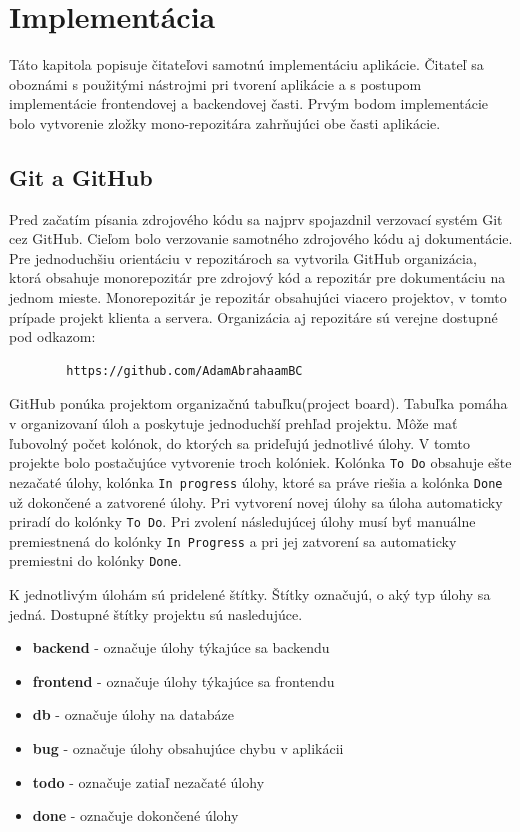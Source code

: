 \chapter{Implementácia}
\label{kapitola5}
Táto kapitola popisuje čitateľovi samotnú implementáciu aplikácie. Čitateľ sa oboznámi s použitými nástrojmi pri tvorení aplikácie a s postupom implementácie frontendovej a backendovej časti. Prvým bodom implementácie bolo vytvorenie zložky mono-repozitára zahrňujúci obe časti aplikácie.

\section{Git a GitHub}
\label{git}
Pred začatím písania zdrojového kódu sa najprv spojazdnil verzovací systém Git cez GitHub. Cieľom bolo verzovanie samotného zdrojového kódu aj dokumentácie. Pre jednoduchšiu orientáciu v repozitároch sa vytvorila GitHub organizácia, ktorá obsahuje monorepozitár pre zdrojový kód a repozitár pre dokumentáciu na jednom mieste. Monorepozitár je repozitár obsahujúci viacero projektov, v tomto prípade projekt klienta a servera. Organizácia aj repozitáre sú verejne dostupné pod odkazom:
    \begin{verbatim}
        https://github.com/AdamAbrahaamBC
    \end{verbatim}
GitHub ponúka projektom organizačnú tabuľku(project board). Tabuľka pomáha v organizovaní úloh a poskytuje jednoduchší prehľad projektu. Môže mať ľubovolný počet kolónok, do ktorých sa prideľujú jednotlivé úlohy. V tomto projekte bolo postačujúce vytvorenie troch kolóniek. Kolónka \texttt{To Do} obsahuje ešte nezačaté úlohy, kolónka \texttt{In progress} úlohy, ktoré sa práve riešia a kolónka \texttt{Done} už dokončené a zatvorené úlohy. Pri vytvorení novej úlohy sa úloha automaticky priradí do kolónky \texttt{To Do}. Pri zvolení následujúcej úlohy musí byť manuálne premiestnená do kolónky \texttt{In Progress} a pri jej zatvorení sa automaticky premiestni do kolónky \texttt{Done}.


K jednotlivým úlohám sú pridelené štítky. Štítky označujú, o aký typ úlohy sa jedná. Dostupné štítky projektu sú nasledujúce.

    \begin{itemize}
        \item\textbf{backend} - označuje úlohy týkajúce sa backendu
        \item\textbf{frontend} - označuje úlohy týkajúce sa frontendu
        \item\textbf{db} - označuje úlohy na databáze
        \item\textbf{bug} - označuje úlohy obsahujúce chybu v aplikácii
        \item\textbf{todo} - označuje zatiaľ nezačaté úlohy
        \item\textbf{done} - označuje dokončené úlohy
    \end{itemize}
    
